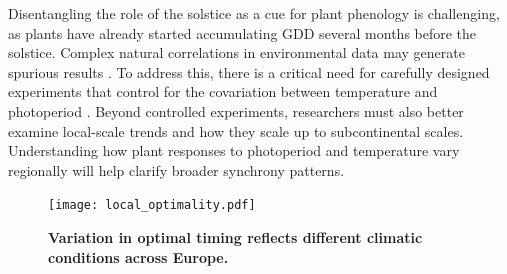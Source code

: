 \documentclass[11pt,letter]{article}
\begin{document}
Disentangling the role of the solstice as a cue for plant phenology is challenging, as plants have already started accumulating GDD several months before the solstice.
Complex natural correlations in environmental data may generate spurious results \citep{Gao2024}. %
To address this, there is a critical need for carefully designed experiments that control for the covariation between temperature and photoperiod  \citep{Buonaiuto2023}.
Beyond controlled experiments, researchers must also better examine local-scale trends and how they scale up to subcontinental scales. Understanding how plant responses to photoperiod and temperature vary regionally will help clarify broader synchrony patterns.

\begin{figure}[h]
\centering
\texttt{[image: local\_optimality.pdf]}
\vspace*{-0.7cm}
\caption{\textbf{Variation in optimal timing reflects different climatic conditions across Europe.}}
\label{fig:localoptimality}
\end{figure}



\end{document}
